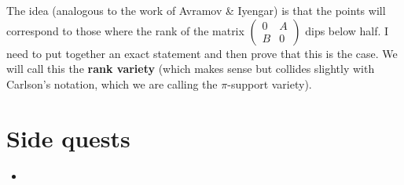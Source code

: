\documentclass[12pt]{article}
\begin{document}
The idea (analogous to the work of Avramov \& Iyengar) is that the points will correspond to those where the rank of the matrix $(\begin{smallmatrix}0 & A\\B&0\end{smallmatrix})$ dips below half. I need to put together an exact statement and then prove that this is the case. We will call this the \textbf{rank variety} (which makes sense but collides slightly with Carlson's notation, which we are calling the $\pi$-support variety).

\section{Side quests}
\begin{itemize}
    \item 
\end{itemize}
\end{document}
